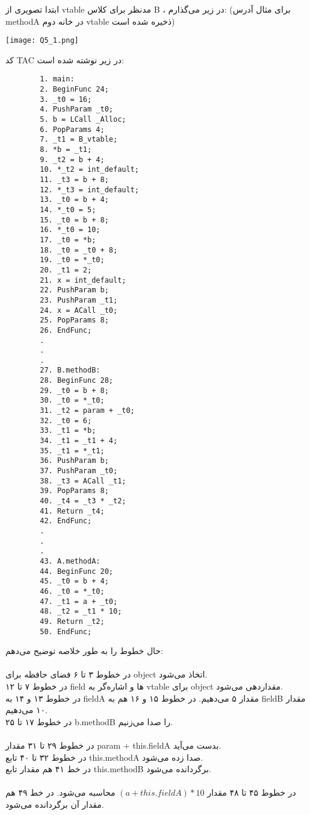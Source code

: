 ابتدا تصویری از vtable مدنظر برای کلاس B ، در زیر می‌گذارم: (برای مثال آدرس methodA در خانه دوم vtable ذخیره شده است)\\
\graphicspath{{./images/}}
\begin{center}
	\texttt{[image: Q5\_1.png]}
\end{center}
کد TAC در زیر نوشته شده است:
\begin{latin}
	\begin{verbatim}
		1. main:
		2. BeginFunc 24;
		3. _t0 = 16;
		4. PushParam _t0;
		5. b = LCall _Alloc;
		6. PopParams 4;
		7. _t1 = B_vtable;
		8. *b = _t1;
		9. _t2 = b + 4;
		10. *_t2 = int_default;
		11. _t3 = b + 8;
		12. *_t3 = int_default;
		13. _t0 = b + 4;
		14. *_t0 = 5;
		15. _t0 = b + 8;
		16. *_t0 = 10;
		17. _t0 = *b;
		18. _t0 = _t0 + 8;
		19. _t0 = *_t0;
		20. _t1 = 2;
		21. x = int_default;
		22. PushParam b;
		23. PushParam _t1;
		24. x = ACall _t0;
		25. PopParams 8;
		26. EndFunc;
		.
		.
		.
		27. B.methodB:
		28. BeginFunc 28;
		29. _t0 = b + 8;
		30. _t0 = *_t0;
		31. _t2 = param + _t0; 
		32. _t0 = 6;
		33. _t1 = *b;
		34. _t1 = _t1 + 4;
		35. _t1 = *_t1;
		36. PushParam b;
		37. PushParam _t0;
		38. _t3 = ACall _t1;
		39. PopParams 8;
		40. _t4 = _t3 * _t2;
		41. Return _t4;
		42. EndFunc;
		.
		.
		.
		43. A.methodA:
		44. BeginFunc 20;
		45. _t0 = b + 4;
		46. _t0 = *_t0;
		47. _t1 = a + _t0;
		48. _t2 = _t1 * 10;
		49. Return _t2;
		50. EndFunc;
	\end{verbatim}
\end{latin}
حال خطوط را به طور خلاصه توضیح می‌دهم:\\\\
در خطوط ۳ تا ۶ فضای حافظه برای object اتخاذ می‌شود.\\
در خطوط ۷ تا ۱۲ field ها و اشاره‌گر به vtable برای object مقداردهی می‌شود.\\
در خطوط ۱۳ و ۱۴ به fieldA مقدار ۵ می‌دهیم. در خطوط ۱۵ و ۱۶ هم به fieldB مقدار ۱۰ می‌دهیم.\\
در خطوط ۱۷ تا ۲۵ b.methodB را صدا می‌زنیم.\\\\
در خطوط ۲۹ تا ۳۱ مقدار param + this.fieldA بدست می‌آید.\\
در خطوط ۳۲ تا ۴۰ تابع this.methodA صدا زده می‌شود.\\
در خط ۴۱ هم مقدار تابع this.methodB برگردانده می‌شود.\\\\
در خطوط ۴۵ تا ۴۸ مقدار $(a + this.fieldA) * 10$ محاسبه می‌شود.
در خط ۴۹ هم مقدار آن برگردانده می‌شود.




